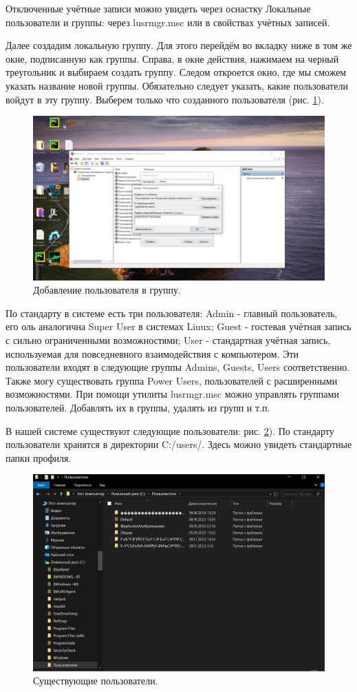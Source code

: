 Отключенные учётные записи можно увидеть через оснастку Локальные пользователи и группы: через lusrmgr.msc или в свойствах учётных записей.

Далее создадим локальную группу. Для этого перейдём во вкладку ниже в том же окне, подписанную как группы. Справа, в окне действия, нажимаем на черный треугольник и выбираем создать группу. Следом откроется окно, где мы сможем указать название новой группы. Обязательно следует указать, какие пользователи войдут в эту группу. Выберем только что созданного пользователя (рис. \ref{fig:AddGroup}). 
\begin{figure}[h!]
    \centering
    \includegraphics[width=0.5\linewidth]{Pic/lab1/photo_2025-05-21_08-15-25.jpg}
    \caption{Добавление пользователя в группу.}
    \label{fig:AddGroup}
\end{figure}

По стандарту в системе есть три пользователя: Admin - главный пользователь, его оль аналогична Super User в системах Linux; Guest - гостевая учётная запись с сильно ограниченными возможностями; User - стандартная учётная запись, используемая для повседневного взаимодействия с компьютером. Эти пользователи входят в следующие группы Admins, Guests, Users соответственно. Также могу существовать группа Power Users, пользователей с расширенными возможностями. При помощи утилиты lusrmgr.msc можно управлять группами пользователей. Добавлять их в группы, удалять из групп и т.п. 

В нашей системе существуют следующие пользователи: рис. \ref{fig:users}). По стандарту пользователи хранятся в директории C:/users/. Здесь можно увидеть стандартные папки профиля.

\begin{figure}[h!]
    \centering
    \includegraphics[width=0.5\linewidth]{Pic/lab1/photo_2025-05-21_08-15-26.jpg}
    \caption{Существующие пользователи.}
    \label{fig:users}
\end{figure}


